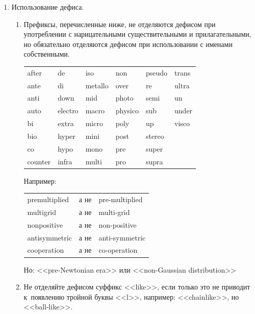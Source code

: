\documentclass[a5paper, 10pt, twoside, numbers=enddot]{scrartcl}
\begin{document}
\begin{enumerate}
  \item Использование дефиса.
    \begin{enumerate}
      \item Префиксы, перечисленные ниже, не отделяются дефисом при употреблении с нарицательными
        существительными и прилагательными, но обязательно отделяются дефисом при использовании с
        именами собственными.
        \begin{center}
          \sffamily
          \begin{tabular}{llllll}
            after    & de       & iso      & non      & pseudo  & trans\\
            ante     & di       & metallo  & over     & re      & ultra\\
            anti     & down     & mid      & photo    & semi    & un\\
            auto     & electro  & macro    & physico  & sub     & under\\
            bi       & extra    & micro    & poly     & up      & visco\\
            bio      & hyper    & mini     & post     & stereo  &\\
            co       & hypo     & mono     & pre      & super   &\\
            counter  & infra    & multi    & pro      & supra   &\\
          \end{tabular}
        \end{center}
        Например:
        \begin{center}
          \sffamily
          \begin{tabular}{lll}
            premultiplied  & а не & pre-multiplied\\
            multigrid      & а не & multi-grid\\
            nonpositive    & а не & non-positive\\
            antisymmetric  & а не & anti-symmetric\\
            cooperation    & а не & co-operation
          \end{tabular}
        \end{center}
        Но: <<pre-Newtonian era>> или <<non-Gaussian distribution>>

      \item Не отделяйте дефисом суффикс <<like>>, если только это не приводит к~появлению тройной
        буквы <<l>>, например: <<chainlike>>, но <<ball-like>>.


\end{enumerate}
\end{enumerate}
\end{document}
